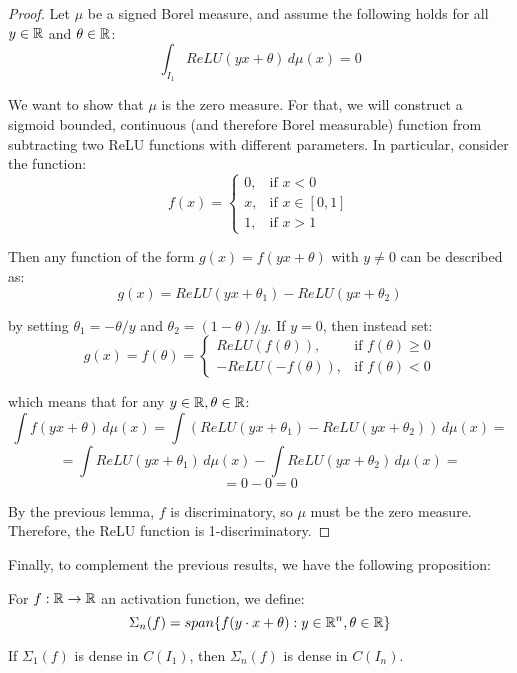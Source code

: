 \begin{proof}
    Let $\mu$ be a signed Borel measure, and assume the following holds for all $y \in \mathbb{R}$ and $\theta \in \mathbb{R}$:
    $$\int_{I_1} ReLU(yx + \theta) \, d\mu(x) = 0$$

    We want to show that $\mu$ is the zero measure. For that, we will construct a sigmoid bounded, continuous
    (and therefore Borel measurable) function from subtracting two ReLU functions with different parameters.
    In particular, consider the function:
    $$f(x) = \begin{cases}
        0, & \text{if } x < 0 \\
        x, & \text{if } x \in [0, 1] \\
        1, & \text{if } x > 1
    \end{cases}$$

    Then any function of the form $g(x) = f(yx + \theta)$ with $y \neq 0$ can be described as:
    $$g(x) = ReLU(yx + \theta_1) - ReLU(yx + \theta_2)$$

    by setting $\theta_1 = -\theta / y$ and $\theta_2 = (1 - \theta)/y$. If $y=0$, then instead set:
    $$g(x) = f(\theta) = \begin{cases}
        ReLU(f(\theta)), & \text{if } f(\theta) \geq 0 \\
        -ReLU(-f(\theta)), & \text{if } f(\theta) < 0
    \end{cases}$$

    which means that for any $y \in \mathbb{R}, \theta \in \mathbb{R}$:
    $$\int f(yx + \theta) \, d\mu(x) = \int (ReLU(yx + \theta_1) - ReLU(yx + \theta_2)) \, d\mu(x) =$$
    $$= \int ReLU(yx + \theta_1) \, d\mu(x) - \int ReLU(yx + \theta_2) \, d\mu(x) =$$
    $$= 0 - 0 = 0$$

    By the previous lemma, $f$ is discriminatory, so $\mu$ must be the zero measure.
    Therefore, the ReLU function is 1-discriminatory.

\end{proof}

Finally, to complement the previous results, we have the following proposition:

\begin{definition}
    For $f: \mathbb{R} \to \mathbb{R}$ an activation function, we define:
    $$\Sigma_n(f) = span \{f(y \cdot x + \theta): y\in \mathbb{R}^n, \theta \in \mathbb{R}\}$$
\end{definition}

\begin{proposition}
    If $\Sigma_1(f)$ is dense in $C(I_1)$, then $\Sigma_n(f)$ is dense in $C(I_n)$.
\end{proposition}


